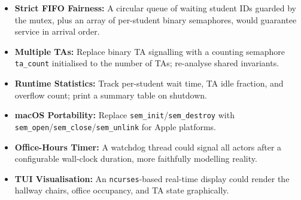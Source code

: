 \documentclass[12pt,a4paper]{report}
\begin{document}
\begin{itemize}[leftmargin=2em,itemsep=3pt]
  \item \textbf{Strict FIFO Fairness:} A circular queue of waiting student IDs guarded by
        the mutex, plus an array of per-student binary semaphores, would guarantee service in
        arrival order.
  \item \textbf{Multiple TAs:} Replace binary TA signalling with a counting semaphore
        \texttt{ta\_count} initialised to the number of TAs; re-analyse shared invariants.
  \item \textbf{Runtime Statistics:} Track per-student wait time, TA idle fraction, and
        overflow count; print a summary table on shutdown.
  \item \textbf{macOS Portability:} Replace \texttt{sem\_init}/\texttt{sem\_destroy} with
        \texttt{sem\_open}/\texttt{sem\_close}/\texttt{sem\_unlink} for Apple platforms.
  \item \textbf{Office-Hours Timer:} A watchdog thread could signal all actors after a
        configurable wall-clock duration, more faithfully modelling reality.
  \item \textbf{TUI Visualisation:} An \texttt{ncurses}-based real-time display could render
        the hallway chairs, office occupancy, and TA state graphically.
\end{itemize}
\end{document}
